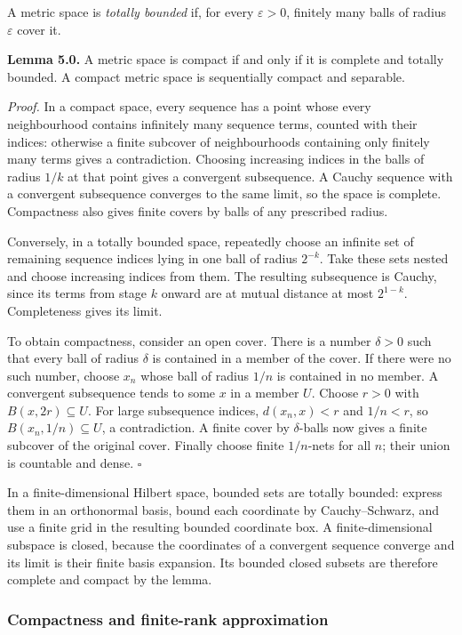 \documentclass[
  english,
  11pt,
  a4paper,
]{article}
\begin{document}
A metric space is \emph{totally bounded} if, for every
\(\varepsilon>0\), finitely many balls of radius \(\varepsilon\) cover
it.

\textbf{Lemma 5.0.} A metric space is compact if and only if it is
complete and totally bounded. A compact metric space is sequentially
compact and separable.

\emph{Proof.} In a compact space, every sequence has a point whose every
neighbourhood contains infinitely many sequence terms, counted with
their indices: otherwise a finite subcover of neighbourhoods containing
only finitely many terms gives a contradiction. Choosing increasing
indices in the balls of radius \(1/k\) at that point gives a convergent
subsequence. A Cauchy sequence with a convergent subsequence converges
to the same limit, so the space is complete. Compactness also gives
finite covers by balls of any prescribed radius.

Conversely, in a totally bounded space, repeatedly choose an infinite
set of remaining sequence indices lying in one ball of radius
\(2^{-k}\). Take these sets nested and choose increasing indices from
them. The resulting subsequence is Cauchy, since its terms from stage
\(k\) onward are at mutual distance at most \(2^{1-k}\). Completeness
gives its limit.

To obtain compactness, consider an open cover. There is a number
\(\delta>0\) such that every ball of radius \(\delta\) is contained in a
member of the cover. If there were no such number, choose \(x_n\) whose
ball of radius \(1/n\) is contained in no member. A convergent
subsequence tends to some \(x\) in a member \(U\). Choose \(r>0\) with
\(B(x,2r)\subseteq U\). For large subsequence indices, \(d(x_n,x)<r\)
and \(1/n<r\), so \(B(x_n,1/n)\subseteq U\), a contradiction. A finite
cover by \(\delta\)-balls now gives a finite subcover of the original
cover. Finally choose finite \(1/n\)-nets for all \(n\); their union is
countable and dense. \(\square\)

In a finite-dimensional Hilbert space, bounded sets are totally bounded:
express them in an orthonormal basis, bound each coordinate by
Cauchy--Schwarz, and use a finite grid in the resulting bounded
coordinate box. A finite-dimensional subspace is closed, because the
coordinates of a convergent sequence converge and its limit is their
finite basis expansion. Its bounded closed subsets are therefore
complete and compact by the lemma.

\subsubsection{Compactness and finite-rank
approximation}\label{hilbert-spaces-and-compact-operators--compactness-and-finite-rank-approximation}
\end{document}

